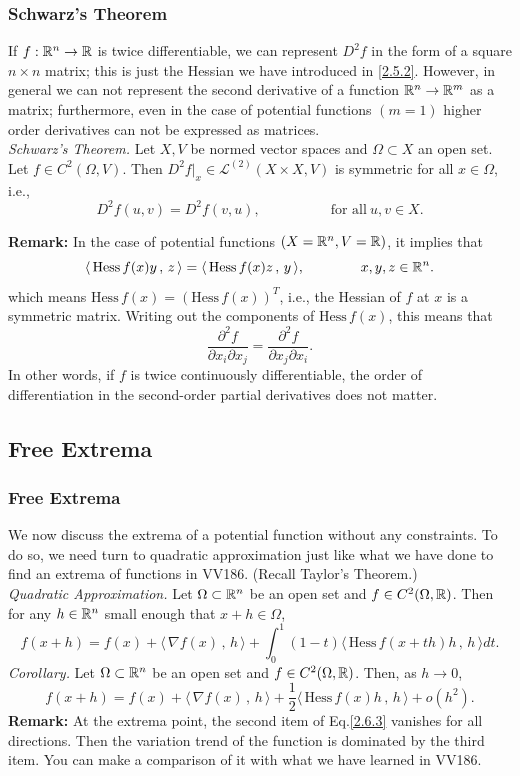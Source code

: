 \documentclass[11pt, t]{beamer}
\renewcommand{\emph}[1]{{\color{Turquoise3}\textsl{#1}}}
\newcommand{\nullspace}{~\\[15pt]}
\newcommand{\scp}[2]{\langle\,#1\,,\,#2\,\rangle} \newcommand{\scpp}{\langle\,\cdot\,,\,\cdot\,\rangle}
\begin{document}
\begin{frame}
    \frametitle{Schwarz's Theorem}

    If $f:\mathbb{R}^n\to\mathbb{R}$ is twice dif{}ferentiable, we can represent $D^2f$ in the form of a square $n\times n$ matrix; this is just the Hessian we have introduced in \eqref{2.5.2}.
    However, in general we can not represent the second derivative of a
    function $\mathbb{R}^n\to\mathbb{R}^m$ as a matrix; furthermore, even in the case of potential functions $(m=1)$ higher order derivatives can not be expressed as matrices.\\[6pt]
    \emph{Schwarz's Theorem.} Let $X,V$ be normed vector spaces and $\Omega\subset X$ an open set. Let $f\in C^2(\Omega,V)$. Then $D^2f|_x\in\mathcal{L}^{(2)}(X\times X,V)$ is symmetric for all $x\in\Omega$, i.e.,
    \[D^2f(u,v)=D^2f(v,u),\qquad\qquad\quad
        \text{for all}~u,v\in X.\]

    \textbf{Remark:} In the case of potential functions $(X=\mathbb{R}^n,V=\mathbb{R})$, it implies that
    \[\scp{\text{Hess}\,f(x)y}{z}=\scp{\text{Hess}\,f(x)z}{y},
        \qquad\qquad x,y,z\in\R^n.\]
    which means $\text{Hess}\,f(x)=(\text{Hess}\,f(x))^T$, i.e., the Hessian of $f$ at $x$ is a symmetric matrix. Writing out the components of $\text{Hess}\,f(x)$, this means that
    \[\frac{\partial^2f}{\partial x_i\partial x_j}=\frac{\partial^2f}{\partial x_j\partial x_i}.\]
    In other words, if $f$ is twice continuously dif{}ferentiable, the order of
    dif{}ferentiation in the second-order partial derivatives does not matter.
\end{frame}

\subsection{Free Extrema}
\begin{frame}
    \frametitle{Free Extrema}
    We now discuss the extrema of a potential function without any constraints. To do so, we need turn to quadratic approximation just like what we have done to find an extrema of functions in VV186. (Recall Taylor's Theorem.)
    \nullspace
    \emph{Quadratic Approximation.} Let $\Omega\subset\mathbb{R}^n$ be an open set and $f\in C^2(\Omega,\mathbb{R})$. Then for any $h\in\mathbb{R}^n$ small enough that $x+h\in\Omega$,
    \begin{equation}\label{2.6.2}
        f(x+h)=f(x)+\scp{\nabla f(x)}{h}+\int_{0}^{1}(1-t)\scp{\text{Hess}\,f(x+th)h}{h}dt.
    \end{equation}
    \emph{Corollary.} Let $\Omega\subset\mathbb{R}^n$ be an open set and $f\in C^2(\Omega,\mathbb{R})$. Then, as $h\to0$,
    \begin{equation}\label{2.6.3}
        f(x+h)=f(x)+\scp{\nabla f(x)}{h}+\frac{1}{2}\scp{\text{Hess}\,f(x)h}{h}+o(h^2).
    \end{equation}
    \textbf{Remark:} At the extrema point, the second item of Eq.\ref{2.6.3} vanishes for all directions. Then the variation trend of the function is dominated by the third item. You can make a comparison of it with what we have learned in VV186.
\end{frame}
\end{document}

